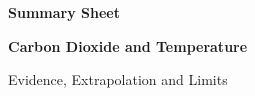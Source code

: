 
\begin{center}
{\large\bfseries Summary Sheet}\par\vspace{9pt}
{\LARGE\bfseries Carbon Dioxide and Temperature}\par\vspace{4pt}
{\large Evidence, Extrapolation and Limits}\par\vspace{10pt}
\end{center}
                                                                                                                                                                                                                                                                                                                                                                                                                                                                                                                                                                       
                                                                                                                                                                                                                                                                                                                                                                                            
\begin{center}\small

\end{center}
                                                                                                                                                                                                      
                                                                                                                                                                                                                                                                                                                                                                                                                                                                                                                          
                                                                                                                                                                                        
